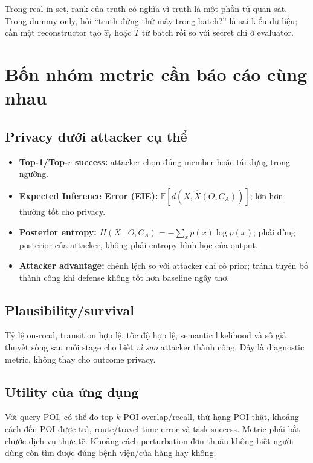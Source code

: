 \documentclass[11pt,a4paper,oneside]{report}
\begin{document}
Trong real-in-set, rank của truth có nghĩa vì truth là một phần tử quan sát. Trong
dummy-only, hỏi ``truth đứng thứ mấy trong batch?'' là sai kiểu dữ liệu; cần một
reconstructor tạo $\hat{x}_t$ hoặc $\hat{T}$ từ batch rồi so với secret chỉ ở evaluator.

\section{Bốn nhóm metric cần báo cáo cùng nhau}

\subsection{Privacy dưới attacker cụ thể}

\begin{itemize}
  \item \textbf{Top-1/Top-$r$ success:} attacker chọn đúng member hoặc tái dựng trong ngưỡng.
  \item \textbf{Expected Inference Error (EIE):}
  $\mathbb{E}[d(X,\hat X(O,C_A))]$; lớn hơn thường tốt cho privacy.
  \item \textbf{Posterior entropy:} $H(X\mid O,C_A)=-\sum_xp(x)\log p(x)$; phải dùng
  posterior của attacker, không phải entropy hình học của output.
  \item \textbf{Attacker advantage:} chênh lệch so với attacker chỉ có prior; tránh
  tuyên bố thành công khi defense không tốt hơn baseline ngây thơ.
\end{itemize}

\subsection{Plausibility/survival}

Tỷ lệ on-road, transition hợp lệ, tốc độ hợp lệ, semantic likelihood và số giả
thuyết sống sau mỗi stage cho biết \emph{vì sao} attacker thành công. Đây là
diagnostic metric, không thay cho outcome privacy.

\subsection{Utility của ứng dụng}

Với query POI, có thể đo top-$k$ POI overlap/recall, thứ hạng POI thật, khoảng cách
đến POI được trả, route/travel-time error và task success. Metric phải bắt chước
dịch vụ thực tế. Khoảng cách perturbation đơn thuần không biết người dùng còn tìm
được đúng bệnh viện/cửa hàng hay không.
\end{document}
